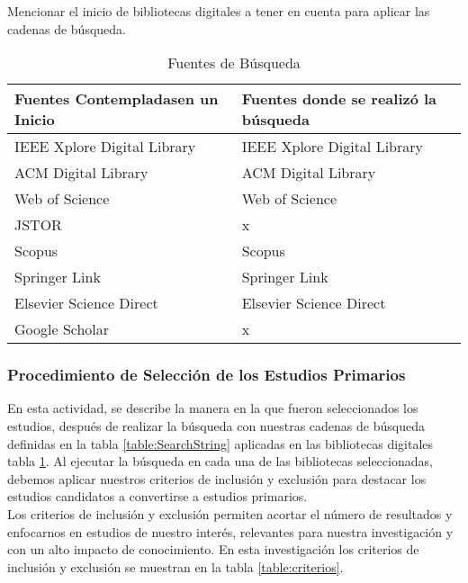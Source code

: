 \documentclass[fleqn,10pt]{SelfArx} %
\begin{document}
Mencionar el inicio de bibliotecas digitales a tener en cuenta para aplicar las cadenas de búsqueda.

\begin{table}
    \begin{center}
        \caption{Fuentes de Búsqueda}
        \label{table:libraries}
        \begin{tabular}{| p{3.8cm} | p{3.8cm} |}
            \toprule
            \hline
            \textbf {Fuentes Contempladasen un Inicio} &  \textbf{Fuentes donde se realizó la búsqueda}\\
            \hline
            IEEE Xplore Digital Library & IEEE Xplore Digital Library\\
            \hline
            ACM Digital Library & ACM Digital Library\\
            \hline
            Web of Science & Web of Science\\
            \hline
            JSTOR & x\\
            \hline
            Scopus & Scopus\\
            \hline
            Springer Link & Springer Link\\
            \hline
            Elsevier Science Direct & Elsevier Science Direct\\
            \hline
            Google Scholar & x\\
            \hline
        \end{tabular}
    \end{center}
\end{table}


	\subsubsection{Procedimiento de Selección de los Estudios Primarios}
	En esta actividad, se describe la manera en la que fueron seleccionados los estudios, después de realizar la búsqueda con nuestras cadenas de búsqueda definidas en la tabla \ref{table:SearchString} aplicadas en las bibliotecas digitales tabla \ref{table:libraries}. Al ejecutar la búsqueda en cada una de las bibliotecas seleccionadas, debemos aplicar nuestros criterios de inclusión y exclusión para destacar los estudios candidatos a convertirse a estudios primarios.\\
	Los criterios de inclusión y exclusión permiten acortar el número de resultados y enfocarnos en estudios de nuestro interés, relevantes para nuestra investigación y con un alto impacto de conocimiento. En esta investigación los criterios de inclusión y exclusión se muestran en la tabla \ref{table:criterios}.
	
\end{document}

